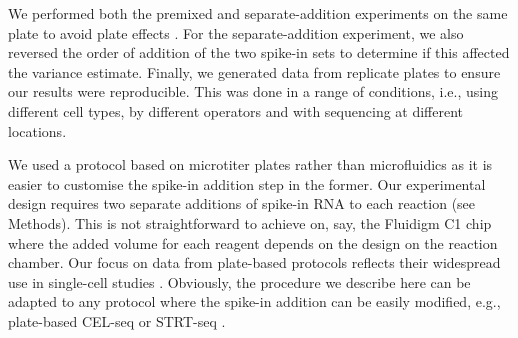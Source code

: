 \documentclass{article}
\begin{document}
We performed both the premixed and separate-addition experiments on the same plate to avoid plate effects \autocite{hicks2015widespread,tung2016batch}.
For the separate-addition experiment, we also reversed the order of addition of the two spike-in sets to determine if this affected the variance estimate.
Finally, we generated data from replicate plates to ensure our results were reproducible.
This was done in a range of conditions, i.e., using different cell types, by different operators and with sequencing at different locations.

We used a protocol based on microtiter plates rather than microfluidics as it is easier to customise the spike-in addition step in the former.
Our experimental design requires two separate additions of spike-in RNA to each reaction (see Methods).
This is not straightforward to achieve on, say, the Fluidigm C1 chip where the added volume for each reagent depends on the design on the reaction chamber.
Our focus on data from plate-based protocols reflects their widespread use in single-cell studies \autocite{segerstople2016single,islam2011characterization,wilson2015combined,scialdone2016resolving}.
Obviously, the procedure we describe here can be adapted to any protocol where the spike-in addition can be easily modified, e.g., plate-based CEL-seq \autocite{hashimshony2016celseq2} or STRT-seq \autocite{islam2011characterization}.
\end{document}
